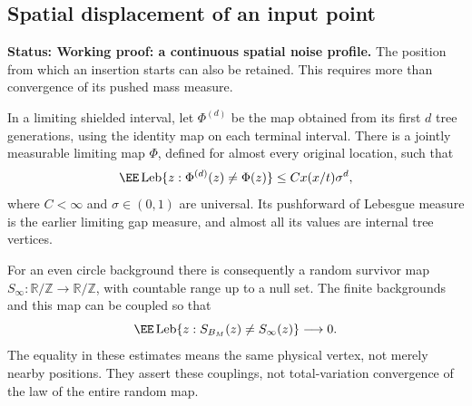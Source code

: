 \documentclass[11pt,letterpaper]{article}
\newcommand{\T}{\mathbb R/\mathbb Z}\newcommand{\Leb}{\operatorname{Leb}}
\newcommand{\status}[1]{\textbf{Status: #1.}}
\begin{document}
\subsection{Spatial displacement of an input point}
\label{sec:spatial-noise}

\status{Working proof: a continuous spatial noise profile}
The position from which an insertion starts can also be retained.
This requires more than convergence of its pushed mass measure.

\begin{lemma}
\label{lem:origin-map}
In a limiting shielded interval, let $\Phi^{(d)}$ be the map obtained
from its first $d$ tree generations, using the identity map on each
terminal interval. There is a jointly measurable limiting map
$\Phi$, defined for almost every original location, such that
\begin{equation}\label{eq:origin-map-error}
 \EE\Leb\{z:\Phi^{(d)}(z)\ne\Phi(z)\}
       \le C x(x/t)\sigma^d,
\end{equation}
where $C<\infty$ and $\sigma\in(0,1)$ are universal.
Its pushforward of Lebesgue measure is the earlier limiting gap
measure, and almost all its values are internal tree vertices.

For an even circle background there is consequently a random
survivor map $S_\infty:\T\to\T$, with countable range up to a null
set. The finite backgrounds and this map can be coupled so that
\begin{equation}\label{eq:survivor-map-coupling}
 \EE\Leb\{z:S_{B_M}(z)\ne S_\infty(z)\}\longrightarrow0.
\end{equation}
The equality in these estimates means the same physical vertex,
not merely nearby positions. They assert these couplings, not
total-variation convergence of the law of the entire random map.
\end{lemma}
\end{document}
